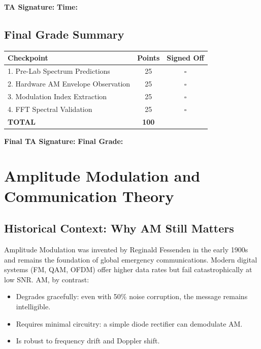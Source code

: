 \documentclass[11pt,letterpaper]{article}
\begin{document}
\vspace{0.3cm}
\textbf{TA Signature:} \underline{\hspace{2.5cm}} \quad \textbf{Time:} \underline{\hspace{1.5cm}}

\vspace{1cm}

\subsection*{Final Grade Summary}

\begin{center}
\begin{tabular}{|l|c|c|}
\hline
\textbf{Checkpoint} & \textbf{Points} & \textbf{Signed Off} \\
\hline
1. Pre-Lab Spectrum Predictions & 25 & $\square$ \\
2. Hardware AM Envelope Observation & 25 & $\square$ \\
3. Modulation Index Extraction & 25 & $\square$ \\
4. FFT Spectral Validation & 25 & $\square$ \\
\hline
\textbf{TOTAL} & \textbf{100} & \\
\hline
\end{tabular}
\end{center}

\vspace{0.5cm}

\textbf{Final TA Signature:} \underline{\hspace{4cm}} \quad \textbf{Final Grade:} \underline{\hspace{1.5cm}}

\clearpage

\appendix

\section{Amplitude Modulation and Communication Theory}

\subsection{Historical Context: Why AM Still Matters}

Amplitude Modulation was invented by Reginald Fessenden in the early 1900s and remains the foundation of global emergency communications. Modern digital systems (FM, QAM, OFDM) offer higher data rates but fail catastrophically at low SNR. AM, by contrast:
\begin{itemize}
    \item Degrades gracefully: even with 50\% noise corruption, the message remains intelligible.
    \item Requires minimal circuitry: a simple diode rectifier can demodulate AM.
    \item Is robust to frequency drift and Doppler shift.
\end{itemize}
\end{document}
